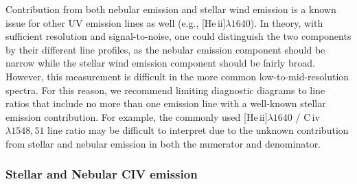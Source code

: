 \documentclass[preprint2,trackchanges]{aastex62}
\newcommand{\heii}{[He\,{\sc ii}]\xspace}
\newcommand{\civ}{C\,{\sc iv}\xspace}
\begin{document}
Contribution from both nebular emission and stellar wind emission is a known issue for other UV emission lines as well (e.g., \heii$\lambda1640$). In theory, with sufficient resolution and signal-to-noise, one could distinguish the two components by their different line profiles, as the nebular emission component should be narrow while the stellar wind emission component should be fairly broad. However, this measurement is difficult in the more common low-to-mid-resolution spectra. For this reason,  we recommend limiting diagnostic diagrams to line ratios that include no more than one emission line with a well-known stellar emission contribution. For example, the commonly used \heii$\lambda1640$ / \civ$\lambda1548,51$ line ratio \citep[e.g.,][]{Feltre+2016, Nakajima+2017} may be difficult to interpret due to the unknown contribution from stellar and nebular emission in both the numerator and denominator.

\subsubsection{Stellar and Nebular CIV emission} \label{sec:obs:civ}
\end{document}
